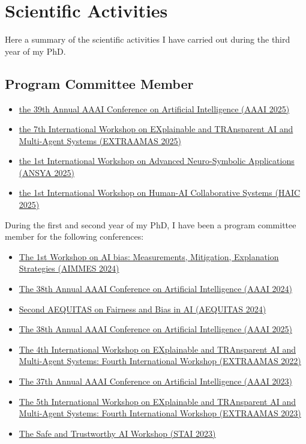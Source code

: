 \documentclass[11pt]{article}
\begin{document}
\section{Scientific Activities}\label{sec:scientific-activities}
%
Here a summary of the scientific activities I have carried out during the third year of my PhD\@.

\subsection{Program Committee Member}\label{subsec:program-committee-member}

\begin{itemize}
	\item \href{https://aaai.org/conference/aaai/aaai-25/}{the 39th Annual AAAI Conference on Artificial Intelligence (AAAI 2025)}
	\item \href{https://extraamas.ehealth.hevs.ch/index.html}{the 7th International Workshop on EXplainable and TRAnsparent AI and Multi-Agent Systems (EXTRAAMAS 2025)}
	\item \href{https://ansya-workshop.github.io/2025}{the 1st International Workshop on Advanced Neuro-Symbolic Applications (ANSYA 2025)}
	\item \href{https://haic-workshop.github.io/haic.github.io}{the 1st International Workshop on Human-AI Collaborative Systems (HAIC 2025)}
\end{itemize}
%
During the first and second year of my PhD, I have been a program committee member for the following conferences:
%
\begin{itemize}
	\item \href{https://fairnesscluster.github.io/aimmes23.github.io/index.html}{The 1st Workshop on AI bias: Measurements, Mitigation, Explanation Strategies (AIMMES 2024)}
	\item \href{https://apice.unibo.it/xwiki/bin/view/Event/Aaai2024}{The 38th Annual AAAI Conference on Artificial Intelligence (AAAI 2024)}
	\item \href{https://aequitas-aod.github.io/aequitas-ecai24.github.io/pc-member.html}{Second AEQUITAS on Fairness and Bias in AI (AEQUITAS 2024)}
	\item \href{https://aaai.org/conference/aaai/aaai-25/}{The 38th Annual AAAI Conference on Artificial Intelligence (AAAI 2025)}
	\item \href{https://extraamas.ehealth.hevs.ch/archive.html#organizations-2022}{The 4th International Workshop on EXplainable and TRAnsparent AI and Multi-Agent Systems: Fourth International Workshop (EXTRAAMAS 2022)}
	\item \href{https://apice.unibo.it/xwiki/bin/view/Event/Aaai2023}{The 37th Annual AAAI Conference on Artificial Intelligence (AAAI 2023)}
	\item \href{https://apice.unibo.it/xwiki/bin/view/Event/Prima2023}{The 5th International Workshop on EXplainable and TRAnsparent AI and Multi-Agent Systems: Fourth International Workshop (EXTRAAMAS 2023)}
	\item \href{https://web.archive.org/web/20240225110652/https://www.stai.uk/stai-23-iclp}{The Safe and Trustworthy AI Workshop (STAI 2023)}
\end{itemize}
\end{document}
